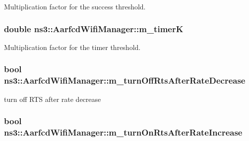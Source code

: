 Multiplication factor for the success threshold. 

\subsubsection[{\texorpdfstring{m\+\_\+timerK}{m_timerK}}]{\setlength{\rightskip}{0pt plus 5cm}double ns3\+::\+Aarfcd\+Wifi\+Manager\+::m\+\_\+timerK\hspace{0.3cm}{\ttfamily [private]}}\hypertarget{classns3_1_1AarfcdWifiManager_a0f41cac60afd7763f1dba44288e87db9}{}\label{classns3_1_1AarfcdWifiManager_a0f41cac60afd7763f1dba44288e87db9}


Multiplication factor for the timer threshold. 

\subsubsection[{\texorpdfstring{m\+\_\+turn\+Off\+Rts\+After\+Rate\+Decrease}{m_turnOffRtsAfterRateDecrease}}]{\setlength{\rightskip}{0pt plus 5cm}bool ns3\+::\+Aarfcd\+Wifi\+Manager\+::m\+\_\+turn\+Off\+Rts\+After\+Rate\+Decrease\hspace{0.3cm}{\ttfamily [private]}}\hypertarget{classns3_1_1AarfcdWifiManager_a5ebefecf767771e0d858de09fdb5c264}{}\label{classns3_1_1AarfcdWifiManager_a5ebefecf767771e0d858de09fdb5c264}


turn off R\+TS after rate decrease 

\subsubsection[{\texorpdfstring{m\+\_\+turn\+On\+Rts\+After\+Rate\+Increase}{m_turnOnRtsAfterRateIncrease}}]{\setlength{\rightskip}{0pt plus 5cm}bool ns3\+::\+Aarfcd\+Wifi\+Manager\+::m\+\_\+turn\+On\+Rts\+After\+Rate\+Increase\hspace{0.3cm}{\ttfamily [private]}}\hypertarget{classns3_1_1AarfcdWifiManager_a0938e5a61b20c3a78db3667d1e06f2fe}{}\label{classns3_1_1AarfcdWifiManager_a0938e5a61b20c3a78db3667d1e06f2fe}



